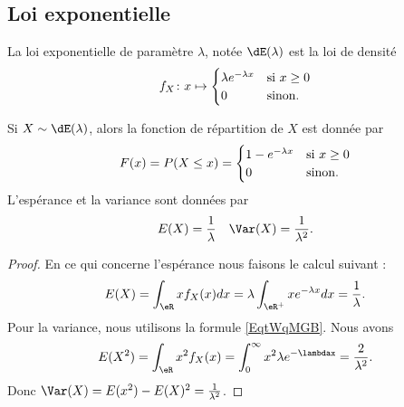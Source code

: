\subsection{Loi exponentielle}

La loi exponentielle de paramètre \( \lambda\), notée \( \dE(\lambda)\) est la loi de densité
\begin{equation}
    f_X\colon x\mapsto\begin{cases}
        \lambda e^{-\lambda x}    &   \text{si \( x\geq 0\)}\\
        0    &    \text{sinon}.
    \end{cases}
\end{equation}

\begin{proposition} \label{PropTxGcWn}
    Si \( X\sim\dE(\lambda)\), alors la fonction de répartition de \( X\) est donnée par
    \begin{equation}
        F(x)=P(X\leq x)=\begin{cases}
            1- e^{-\lambda x}    &   \text{si \( x\geq 0\)}\\
            0    &    \text{sinon}.
    \end{cases}
    \end{equation}
    L'espérance et la variance sont données par
    \begin{equation}
        \begin{aligned}[]
            E(X)&=\frac{1}{ \lambda }&\Var(X)=\frac{1}{ \lambda^2 }.
        \end{aligned}
    \end{equation}
\end{proposition}

\begin{proof}    
    En ce qui concerne l'espérance nous faisons le calcul suivant :
    \begin{equation}
        E(X)=\int_{\eR}xf_X(x)dx=\lambda\int_{\eR^+}x e^{-\lambda x}dx=\frac{1}{ \lambda }.
    \end{equation}
    Pour la variance, nous utilisons la formule \eqref{EqtWqMGB}. Nous avons
    \begin{equation}
        E(X^2)=\int_{\eR}x^2f_X(x)=\int_0^{\infty}x^2\lambda e^{-\lambdax}=\frac{ 2 }{ \lambda^2 }.
    \end{equation}
    Donc \( \Var(X)=E(x^2)-E(X)^2=\frac{1}{ \lambda^2 }\).
\end{proof}

